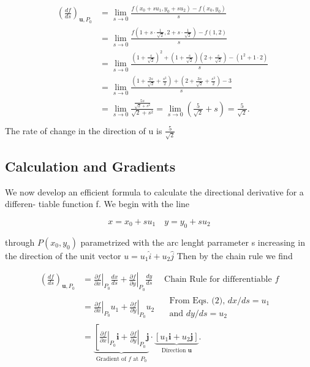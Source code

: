 \documentclass[12pt,a4paper]{article}
\begin{document}
\begin{solution}
    \[\begin{aligned}
        &\begin{aligned}
        \left(\frac{d f}{d s}\right)_{\mathbf{u}, P_0} & =\lim _{s \rightarrow 0} \frac{f\left(x_0+s u_1, y_0+s u_2\right)-f\left(x_0, y_0\right)}{s} \\
        & =\lim _{s \rightarrow 0} \frac{f\left(1+s \cdot \frac{1}{\sqrt{2}}, 2+s \cdot \frac{1}{\sqrt{2}}\right)-f(1,2)}{s} \\
        & =\lim _{s \rightarrow 0} \frac{\left(1+\frac{s}{\sqrt{2}}\right)^2+\left(1+\frac{s}{\sqrt{2}}\right)\left(2+\frac{s}{\sqrt{2}}\right)-\left(1^2+1 \cdot 2\right)}{s} \\
        & =\lim _{s \rightarrow 0} \frac{\left(1+\frac{2 s}{\sqrt{2}}+\frac{s^2}{2}\right)+\left(2+\frac{3 s}{\sqrt{2}}+\frac{s^2}{2}\right)-3}{s} \\
        & =\lim _{s \rightarrow 0} \frac{\frac{5s}{\sqrt{2} + s^2}}{\sqrt{2}+s^2}=\lim _{s \rightarrow 0}\left(\frac{5}{\sqrt{2}}+s\right)=\frac{5}{\sqrt{2}} .
        \end{aligned}\\
        \end{aligned}
        \]
    The rate of change in the direction of u is \(\frac{5}{\sqrt{2}}\)
\end{solution}

\subsection{Calculation and Gradients}

We now develop an efficient formula to calculate the directional derivative for a differen-
tiable function ƒ. We begin with the line

\[x = x_0 + su_1 \quad y = y_0 + su_2\]

through \(P(x_0,y_0)\) parametrized with the arc lenght parrameter s increasing in the direction of the unit vector \(u = u_1 \hat{i} + u_2 \hat{j}\) Then by the chain rule we find

\[\begin{aligned}
    \left(\frac{d f}{d s}\right)_{\mathbf{u}, P_0} & =\left.\frac{\partial f}{\partial x}\right|_{P_0} \frac{d x}{d s}+\left.\frac{\partial f}{\partial y}\right|_{P_0} \frac{d y}{d s} \quad \text { Chain Rule for differentiable } f \\
    & =\left.\frac{\partial f}{\partial x}\right|_{P_0} u_1+\left.\frac{\partial f}{\partial y}\right|_{P_0} u_2 \quad \begin{array}{l}
    \text { From Eqs. (2), } d x / d s=u_1 \\
    \text { and } d y / d s=u_2
    \end{array} \\
    & =\underbrace{\left[\left.\frac{\partial f}{\partial x}\right|_{P_0} \mathbf{i}+\left.\frac{\partial f}{\partial y}\right|_{P_0} \mathbf{j}\right.}_{\text {Gradient of } f \text { at } P_0} \cdot \underbrace{\left[u_1 \mathbf{i}+u_2 \mathbf{j}\right]}_{\text {Direction } \mathbf{u}} .
    \end{aligned}\]
\end{document}
